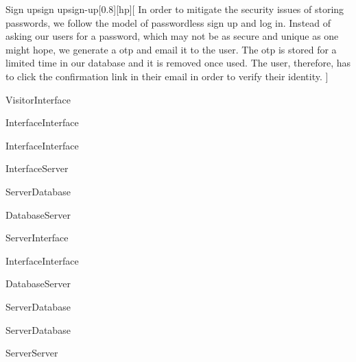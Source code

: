 \begin{sdfig}{Sign up}{sign up}{sign-up}[0.8][hp][
    In order to mitigate the security issues of storing passwords, we follow the model of passwordless sign up and log in.
    Instead of asking our users for a password, which may not be as secure and unique as one might hope, we generate a \acrfull{otp} and email it to the user.
    The \acrshort{otp} is stored for a limited time in our database and it is removed once used.
    The user, therefore, has to click the confirmation link in their email in order to verify their identity.
  ]

  \begin{umlcall}[op={Sign up}]{Visitor}{Interface}
    \begin{umlcall}[op={Validate}]{Interface}{Interface}
      \begin{umlfragment}[type=alt, label=valid]
        \begin{umlcall}[op={Set loading}]{Interface}{Interface}
          \begin{umlcall}[op={Sign up}]{Interface}{Server}
            \begin{umlcall}[op={Has user}]{Server}{Database}
              \begin{umlfragment}[type=alt, label=true]
                \begin{umlcall}[type=return,op={Yes}]{Database}{Server}
                  \begin{umlcall}[type=return,op={Error}]{Server}{Interface}
                    \begin{umlcall}[op={Show error}]{Interface}{Interface}
                    \end{umlcall}
                  \end{umlcall}
                \end{umlcall}
                \umlfpart[else]
                \begin{umlcall}[type=return,op={No}]{Database}{Server}
                  \begin{umlcall}[op={Create user}]{Server}{Database}
                  \end{umlcall}
                  \begin{umlcall}[op={Create OTP}]{Server}{Database}
                    \begin{umlcall}[op={Send email}]{Server}{Server}

\end{umlcall}
\end{umlcall}
\end{umlcall}
\end{umlfragment}
\end{umlcall}
\end{umlcall}
\end{umlcall}
\end{umlfragment}
\end{umlcall}
\end{umlcall}
\end{sdfig}
